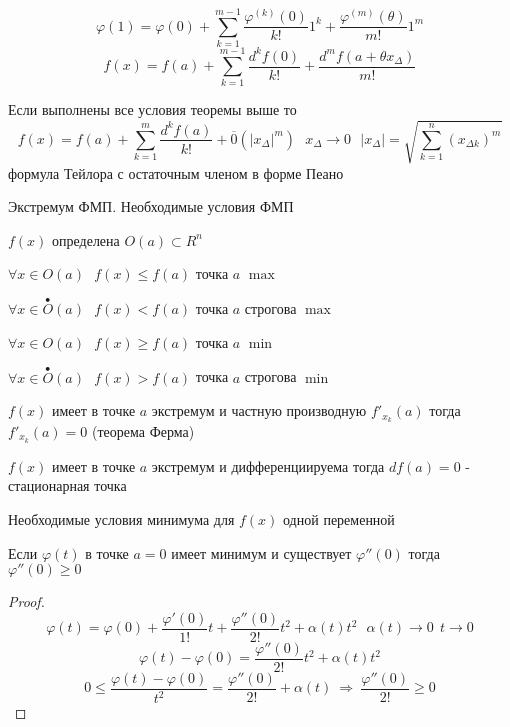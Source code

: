 \begin{block}
  $$
  \varphi(1) = \varphi(0) + \sum_{k=1}^{m-1} \frac{\varphi^{(k)}(0)}{k!} 1^k +
  \frac{\varphi^{(m)}(\theta)}{m!} 1^m
  $$
  $$
  f(x) = f(a) + \sum_{k=1}^{m-1} \frac{d^k f(0)}{k!} +
  \frac{d^m f(a + \theta x_{\Delta})}{m!}
  $$
\end{block}

\begin{block}[Следствие]
  Если выполнены все условия теоремы выше то
  $$
  f(x) = f(a) + \sum_{k=1}^m \frac{d^k f(a)}{k!} + \overline{0}(|x_{\Delta}|^m)
  ~~~ x_{\Delta} \to 0 ~~~ |x_{\Delta}| = \sqrt{\sum_{k=1}^n (x_{\Delta k})^m}
  $$
  формула Тейлора с остаточным членом в форме Пеано
\end{block}

\begin{title}[\Large]
  Экстремум ФМП. Необходимые условия ФМП
\end{title}

\begin{define}
  $f(x)$ определена $O(a) \subset R^n$

  $\forall x \in O(a) ~~~ f(x) \le f(a)$ точка $a$ $\max$

  $\forall x \in \stackrel{\bullet}{O}(a) ~~~ f(x) < f(a)$ точка $a$
  строгова $\max$

  $\forall x \in O(a) ~~~ f(x) \ge f(a)$ точка $a$ $\min$

  $\forall x \in \stackrel{\bullet}{O}(a) ~~~ f(x) > f(a)$ точка $a$
  строгова $\min$
\end{define}

\begin{theorem}
  $f(x)$ имеет в точке $a$ экстремум и частную производную $f'_{x_k}(a)$ тогда
  $f'_{x_k}(a) = 0$ (теорема Ферма)
\end{theorem}

\begin{block}[Следствие]
  $f(x)$ имеет в точке $a$ экстремум и дифференциируема тогда $df(a) = 0$
  - стационарная точка
\end{block}

\begin{block}[Лемма]
  Необходимые условия минимума для $f(x)$ одной переменной

  Если $\varphi(t)$ в точке $a=0$ имеет минимум и существует $\varphi''(0)$
  тогда $\varphi''(0) \ge 0$
\end{block}

\begin{proof}
  $$
  \varphi(t) = \varphi(0) + \frac{\varphi'(0)}{1!}t +
  \frac{\varphi''(0)}{2!}t^2 + \alpha(t)t^2 ~~~ \alpha(t) \to 0 ~~ t \to 0
  $$
  $$
  \varphi(t) - \varphi(0) = \frac{\varphi''(0)}{2!}t^2 + \alpha(t)t^2
  $$
  $$
  0 \le \frac{\varphi(t) - \varphi(0)}{t^2} = \frac{\varphi''(0)}{2!} +
  \alpha(t) ~ \Rightarrow ~ \frac{\varphi''(0)}{2!} \ge 0
  $$
\end{proof}

